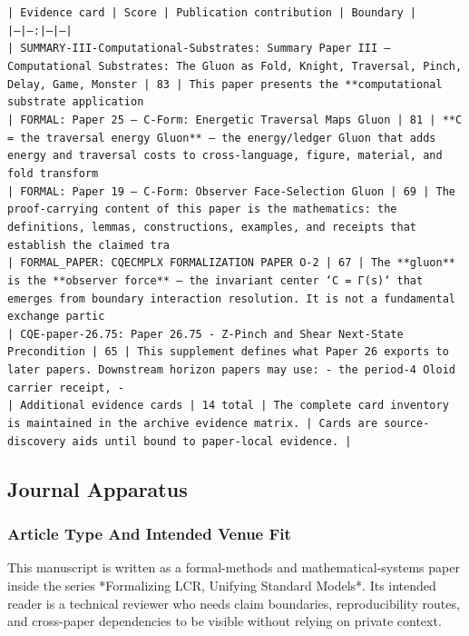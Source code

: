 \documentclass[11pt]{article}
\begin{document}
\noindent\texttt{| Evidence card | Score | Publication contribution | Boundary |}\\
\noindent\texttt{|---|---:|---|---|}\\
\noindent\texttt{| SUMMARY-III-Computational-Substrates: Summary Paper III — Computational Substrates: The Gluon as Fold, Knight, Traversal, Pinch, Delay, Game, Monster | 83 | This paper presents the **computational substrate application}\\
\noindent\texttt{| FORMAL: Paper 25 — C-Form: Energetic Traversal Maps Gluon | 81 | **C = the traversal energy Gluon** — the energy/ledger Gluon that adds energy and traversal costs to cross-language, figure, material, and fold transform}\\
\noindent\texttt{| FORMAL: Paper 19 — C-Form: Observer Face-Selection Gluon | 69 | The proof-carrying content of this paper is the mathematics: the definitions, lemmas, constructions, examples, and receipts that establish the claimed tra}\\
\noindent\texttt{| FORMAL\_PAPER: CQECMPLX FORMALIZATION PAPER O-2 | 67 | The **gluon** is the **observer force** — the invariant center `C = Γ(s)` that emerges from boundary interaction resolution. It is not a fundamental exchange partic}\\
\noindent\texttt{| CQE-paper-26.75: Paper 26.75 - Z-Pinch and Shear Next-State Precondition | 65 | This supplement defines what Paper 26 exports to later papers. Downstream horizon papers may use: - the period-4 Oloid carrier receipt, - }\\
\noindent\texttt{| Additional evidence cards | 14 total | The complete card inventory is maintained in the archive evidence matrix. | Cards are source-discovery aids until bound to paper-local evidence. |}\\

\subsection*{Journal Apparatus}

\subsubsection*{Article Type And Intended Venue Fit}

This manuscript is written as a formal-methods and mathematical-systems paper
inside the series *Formalizing LCR, Unifying Standard Models*. Its intended
reader is a technical reviewer who needs claim boundaries, reproducibility
routes, and cross-paper dependencies to be visible without relying on private
context.
\end{document}
